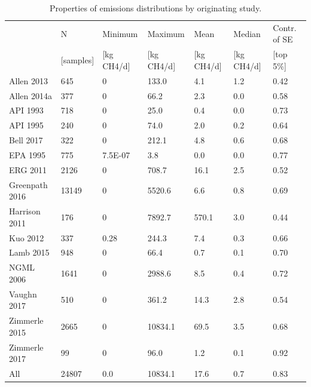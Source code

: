 \documentclass[11pt]{report}
\begin{document}
{{{{\begin{table}
\begin{scriptsize}
\caption{Properties of emissions distributions by originating study.}
\label{tab:emission_dist_study}
\begin{tabular*}{1\columnwidth}{llllllp{}}
\toprule
			& N              & Minimum               & Maximum            & Mean           & Median         & Contr. of SE                                \\
              		& {[}samples{]} & {[}kg CH4/d{]} & {[}kg CH4/d{]} & {[}kg CH4/d{]} & {[}kg CH4/d{]}                   & {[}top 5\%{]} \\
		\midrule
Allen 2013     & 645   & 0           & 133.0   & 4.1    & 1.2                  & 0.42 \\
Allen 2014a    & 377   & 0           & 66.2    & 2.3    & 0.0                  & 0.58 \\
API 1993       & 718   & 0           & 25.0    & 0.4    & 0.0                  & 0.73 \\
API 1995       & 240   & 0           & 74.0    & 2.0    & 0.2                  & 0.64 \\
Bell 2017      & 322   & 0           & 212.1   & 4.8    & 0.6                  & 0.68 \\
EPA 1995       & 775   & 7.5E-07    & 3.8     & 0.0    & 0.0                  & 0.77 \\
ERG 2011       & 2126  & 0           & 708.7   & 16.1   & 2.5                  & 0.52 \\
Greenpath 2016 & 13149 & 0           & 5520.6  & 6.6    & 0.8                  & 0.69 \\
Harrison 2011  & 176   & 0           & 7892.7  & 570.1  & 3.0                  & 0.44 \\
Kuo 2012       & 337   & 0.28 & 244.3   & 7.4    & 0.3                  & 0.66 \\
Lamb 2015      & 948   & 0           & 66.4    & 0.7    & 0.1                  & 0.70 \\
NGML 2006      & 1641  & 0           & 2988.6  & 8.5    & 0.4                  & 0.72 \\
Vaughn 2017    & 510   & 0           & 361.2   & 14.3   & 2.8                  & 0.54 \\
Zimmerle 2015  & 2665  & 0           & 10834.1 & 69.5   & 3.5                  & 0.68 \\
Zimmerle 2017  & 99    & 0           & 96.0    & 1.2    & 0.1                  & 0.92 \\
All            		& 24807             & 0.0            & 10834.1        & 17.6           & 0.7                              & 0.83                         \\
\bottomrule
\end{tabular*}
\end{scriptsize}
\end{table}


}}}}
\end{document}
